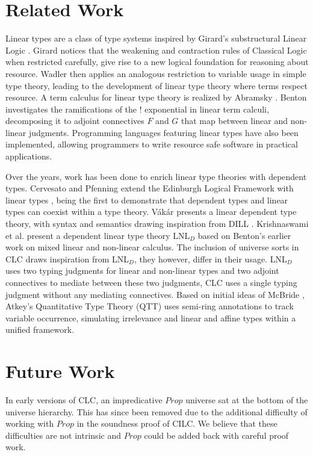 \documentclass[sigplan,screen,review,anonymous]{acmart}
\begin{document}
\section{Related Work}
Linear types are a class of type systems inspired by Girard's substructural Linear Logic \cite{girard}. Girard notices that the weakening and contraction rules of Classical Logic when restricted carefully, give rise to a new logical foundation for reasoning about resource. Wadler \cite{wadler1990,wadler1991} then applies an analogous restriction to variable usage in simple type theory, leading to the development of linear type theory where terms respect resource. A term calculus for linear type theory is realized by Abramsky \cite{abramsky1993}. Benton \cite{benton1994} investigates the ramifications of the ! exponential in linear term calculi, decomposing it to adjoint connectives $F$ and $G$ that map between linear and non-linear judgments. Programming languages \cite{l3,ats,linear-haskell} featuring linear types have also been implemented, allowing programmers to write resource safe software in practical applications.

Over the years, work has been done to enrich linear type theories with dependent types. Cervesato and Pfenning extend the Edinburgh Logical Framework with linear types \cite{lf,llf}, being the first to demonstrate that dependent types and linear types can coexist within a type theory. V\'{a}k\'{a}r \cite{vakar14} presents a linear dependent type theory, with syntax and semantics drawing inspiration from DILL \cite{dill}. Krishnaswami et al. present a dependent linear type theory LNL$_D$ \cite{neel15} based on Benton's earlier work on mixed linear and non-linear calculus. The inclusion of universe sorts in CLC draws inspiration from LNL$_D$, they however, differ in their usage. LNL$_D$ uses two typing judgments for linear and non-linear types and two adjoint connectives to mediate between these two judgments, CLC uses a single typing judgment without any mediating connectives. Based on initial ideas of McBride \cite{nothing}, Atkey's Quantitative Type Theory (QTT) \cite{qtt} uses semi-ring annotations to track variable occurrence, simulating irrelevance and linear and affine types within a unified framework.

\section{Future Work}
In early versions of CLC, an impredicative $Prop$ universe sat at the bottom of the universe hierarchy. This has since been removed due to the additional difficulty of working with $Prop$ in the soundness proof of CILC. We believe that these difficulties are not intrinsic and $Prop$ could be added back with careful proof work.
\end{document}
